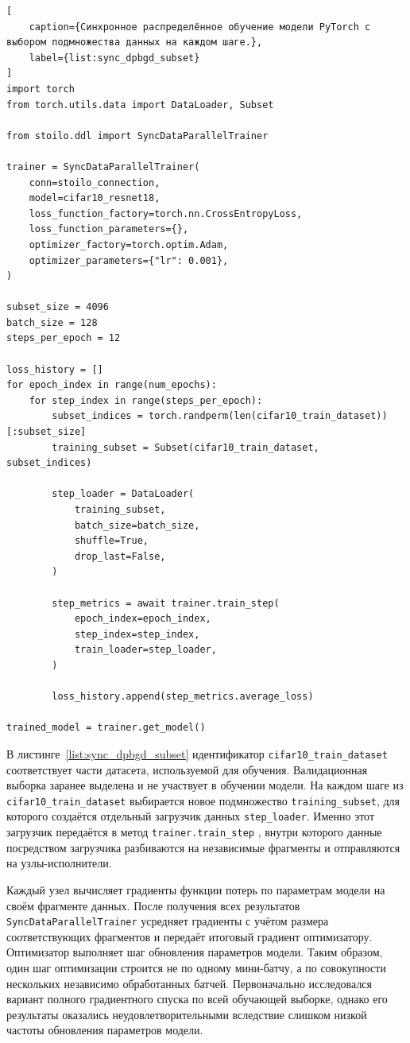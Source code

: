 \documentclass[a4paper,12pt]{extarticle}
\newcommand{\code}[1]{%
    \begingroup
    \setlength{\fboxsep}{1.2pt}%
    \colorbox{inlinecodebg}{\texttt{\textcolor{inlinecodefg}{#1}}}%
    \endgroup
}
\begin{document}
\begin{lstlisting}[
    caption={Синхронное распределённое обучение модели PyTorch с выбором подмножества данных на каждом шаге.},
    label={list:sync_dpbgd_subset}
]
import torch
from torch.utils.data import DataLoader, Subset

from stoilo.ddl import SyncDataParallelTrainer

trainer = SyncDataParallelTrainer(
    conn=stoilo_connection,
    model=cifar10_resnet18,
    loss_function_factory=torch.nn.CrossEntropyLoss,
    loss_function_parameters={},
    optimizer_factory=torch.optim.Adam,
    optimizer_parameters={"lr": 0.001},
)

subset_size = 4096
batch_size = 128
steps_per_epoch = 12

loss_history = []
for epoch_index in range(num_epochs):
    for step_index in range(steps_per_epoch):
        subset_indices = torch.randperm(len(cifar10_train_dataset))[:subset_size]
        training_subset = Subset(cifar10_train_dataset, subset_indices)

        step_loader = DataLoader(
            training_subset,
            batch_size=batch_size,
            shuffle=True,
            drop_last=False,
        )

        step_metrics = await trainer.train_step(
            epoch_index=epoch_index,
            step_index=step_index,
            train_loader=step_loader,
        )

        loss_history.append(step_metrics.average_loss)

trained_model = trainer.get_model()
\end{lstlisting}

В листинге~\ref{list:sync_dpbgd_subset} идентификатор \texttt{cifar10\_train\_dataset} соответствует части датасета, используемой для обучения.
Валидационная выборка заранее выделена и не участвует в обучении модели.
На каждом шаге из \texttt{cifar10\_train\_dataset} выбирается новое подмножество \texttt{training\_subset}, для которого создаётся отдельный загрузчик данных \texttt{step\_loader}.
Именно этот загрузчик передаётся в метод \code{trainer.train\_step}, внутри которого данные посредством загрузчика разбиваются на независимые фрагменты и отправляются на узлы-исполнители.

Каждый узел вычисляет градиенты функции потерь по параметрам модели на своём фрагменте данных.
После получения всех результатов \texttt{SyncDataParallelTrainer} усредняет градиенты с учётом размера соответствующих фрагментов и передаёт итоговый градиент оптимизатору.
Оптимизатор выполняет шаг обновления параметров модели.
Таким образом, один шаг оптимизации строится не по одному мини-батчу, а по совокупности нескольких независимо обработанных батчей.
Первоначально исследовался вариант полного градиентного спуска по всей обучающей выборке, однако его результаты оказались неудовлетворительными вследствие слишком низкой частоты обновления параметров модели.
\end{document}
